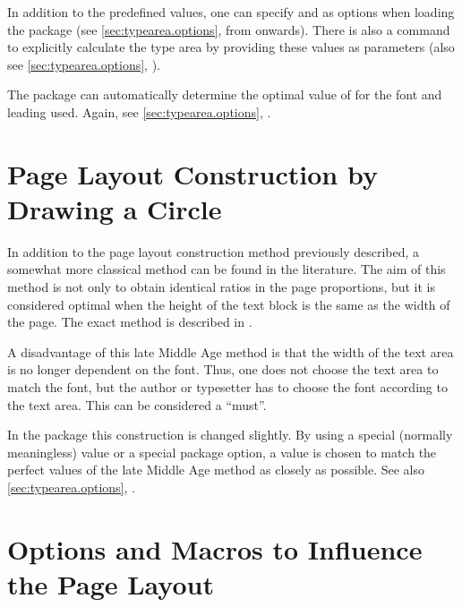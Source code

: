 \begin{Explain}
  In addition to the predefined values, one can specify  and
   as options when loading the package (see
  \autoref{sec:typearea.options}, from
   onwards). There is also a
  command to explicitly calculate the type area by providing these
  values as parameters (also see \autoref{sec:typearea.options},
  ).

  The  package can automatically determine the
  optimal value of  for the font and leading used.
  Again, see \autoref{sec:typearea.options},
  .
\end{Explain}


\section{Page Layout Construction by Drawing a Circle}
\label{sec:typearea.circleConstruction}

\begin{Explain}
  In addition to the page layout construction
  method previously described, a somewhat more classical method can be
  found in the literature. The aim of this method is not only to
  obtain identical ratios in the page proportions, but it is
  considered optimal when the height of the text block is the same as
  the width of the page. The exact method is described in
  \cite{JTsch87}.

  A disadvantage of this late Middle Age method is that the width of
  the text area is no longer dependent on the font. Thus, one does not
  choose the text area to match the font, but the author or typesetter
  has to choose the font according to the text area. This can be
  considered a ``must''.

  In the  package this construction is changed
  slightly. By using a special (normally meaningless)  value
  or a special package option, a  value is chosen to match
  the perfect values of the late Middle Age method as closely as
  possible. See also \autoref{sec:typearea.options},
  .
\end{Explain}



\section{Options and Macros to Influence the Page Layout}
\label{sec:typearea.typearea}

